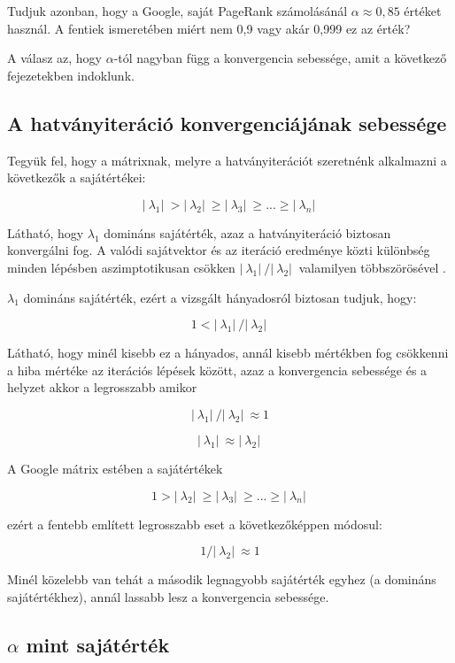 \documentclass[12pt,a4paper]{article}
\begin{document}
Tudjuk azonban, hogy a Google, saját PageRank számolásánál $\alpha \approx 0,85$ \cite{lang2} értéket használ. A fentiek ismeretében miért nem 0,9 vagy akár 0,999 ez az érték? 

A válasz az, hogy $\alpha$-tól nagyban függ a konvergencia sebessége, amit a következő fejezetekben indoklunk.

\subsection{A hatványiteráció konvergenciájának sebessége}\label{konvergencia_sebesseg}

Tegyük fel, hogy a mátrixnak, melyre a hatványiterációt szeretnénk alkalmazni a következők a sajátértékei:

\[ |\ \lambda_1 |\ > |\ \lambda_2 |\ \geq |\ \lambda_3 |\ \geq ... \geq |\ \lambda_n |\ \] 

Látható, hogy $\lambda_1$ domináns sajátérték, azaz a hatványiteráció biztosan konvergálni fog. A valódi sajátvektor és az iteráció eredménye közti különbség minden lépésben aszimptotikusan csökken $ |\ \lambda_1 |\ / |\ \lambda_2 |\ $ valamilyen többszörösével \cite{poweriteration}.

$\lambda_1$ domináns sajátérték, ezért a vizsgált hányadosról biztosan tudjuk, hogy:

\[ 1 < |\ \lambda_1 |\ / |\ \lambda_2 |\ \]

Látható, hogy minél kisebb ez a hányados, annál kisebb mértékben fog csökkenni a hiba mértéke az iterációs lépések között, azaz a konvergencia sebessége és a helyzet akkor a legrosszabb amikor

\[ |\ \lambda_1 |\ / |\ \lambda_2 |\ \approx 1 \]

\[ |\ \lambda_1 |\ \approx |\ \lambda_2 |\ \]

A Google mátrix estében a sajátértékek

\[ 1 > |\ \lambda_2 |\ \geq |\ \lambda_3 |\ \geq ... \geq |\ \lambda_n |\ \]

ezért a fentebb említett legrosszabb eset a következőképpen módosul:

\[ 1 / |\ \lambda_2 |\ \approx 1 \]

Minél közelebb van tehát a második legnagyobb sajátérték egyhez (a domináns sajátértékhez), annál lassabb lesz a konvergencia sebessége.

\subsection{$\alpha$ mint sajátérték}\label{alfa_sajatertek}
\end{document}
